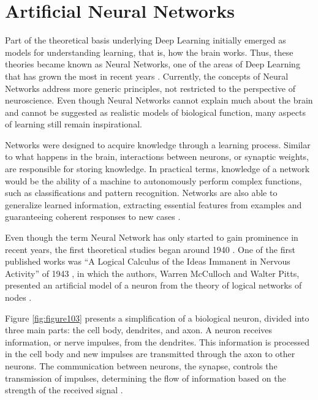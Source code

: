 \section{Artificial Neural Networks} \label{neuralnetsection}

Part of the theoretical basis underlying Deep Learning  initially emerged as models for understanding learning, that is, how the brain works. Thus, these theories became known as Neural Networks, one of the areas of Deep Learning  that has grown the most in recent years \cite{goodfellow2016}. Currently, the concepts of Neural Networks address more generic principles, not restricted to the perspective of neuroscience. Even though Neural Networks cannot explain much about the brain and cannot be suggested as realistic models of biological function, many aspects of learning still remain inspirational.

Networks were designed to acquire knowledge through a learning process. Similar to what happens in the brain, interactions between neurons, or synaptic weights, are responsible for storing knowledge. In practical terms, knowledge of a network would be the ability of a machine to autonomously perform complex functions, such as classifications and pattern recognition. Networks are also able to generalize learned information, extracting essential features from examples and guaranteeing coherent responses to new cases \cite{haykin1999}.

Even though the term Neural Network has only started to gain prominence in recent years, the first theoretical studies began around 1940 \cite{goodfellow2016}. One of the first published works was ``A Logical Calculus of the Ideas Immanent in Nervous Activity'' of 1943 \cite{mcculloch1943}, in which the authors, Warren McCulloch and Walter Pitts, presented an artificial model of a neuron from the theory of logical networks of nodes \cite{goodfellow2016}.

Figure \ref{fig:figure103} presents a simplification of a biological neuron, divided into three main parts: the cell body, dendrites, and axon. A neuron receives information, or nerve impulses, from the dendrites. This information is processed in the cell body and new impulses are transmitted through the axon to other neurons. The communication between neurons, the synapse, controls the transmission of impulses, determining the flow of information based on the strength of the received signal \cite{haykin1999}.

